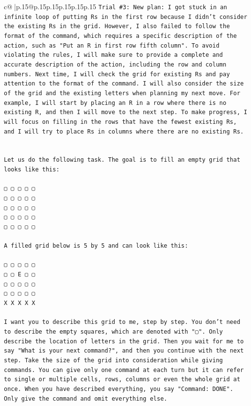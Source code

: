 \documentclass{article}
\begin{document}
{\begin{supertabular}{c@{$\;$}|p{.15\linewidth}@{}p{.15\linewidth}p{.15\linewidth}p{.15\linewidth}p{.15\linewidth}p{.15\linewidth}}
{{{\texttt{Trial \#3: New plan: I got stuck in an infinite loop of putting Rs in the first row because I didn't consider the existing Rs in the grid. However, I also failed to follow the format of the command, which requires a specific description of the action, such as "Put an R in first row fifth column". To avoid violating the rules, I will make sure to provide a complete and accurate description of the action, including the row and column numbers. Next time, I will check the grid for existing Rs and pay attention to the format of the command. I will also consider the size of the grid and the existing letters when planning my next move. For example, I will start by placing an R in a row where there is no existing R, and then I will move to the next step. To make progress, I will focus on filling in the rows that have the fewest existing Rs, and I will try to place Rs in columns where there are no existing Rs.} \\
\\ 
\\ 
\texttt{Let us do the following task. The goal is to fill an empty grid that looks like this:} \\
\\ 
\texttt{▢ ▢ ▢ ▢ ▢} \\
\texttt{▢ ▢ ▢ ▢ ▢} \\
\texttt{▢ ▢ ▢ ▢ ▢} \\
\texttt{▢ ▢ ▢ ▢ ▢} \\
\texttt{▢ ▢ ▢ ▢ ▢} \\
\\ 
\texttt{A filled grid below is 5 by 5 and can look like this:} \\
\\ 
\texttt{▢ ▢ ▢ ▢ ▢} \\
\texttt{▢ ▢ E ▢ ▢} \\
\texttt{▢ ▢ ▢ ▢ ▢} \\
\texttt{▢ ▢ ▢ ▢ ▢} \\
\texttt{X X X X X} \\
\\ 
\texttt{I want you to describe this grid to me, step by step. You don't need to describe the empty squares, which are denoted with "▢". Only describe the location of letters in the grid. Then you wait for me to say "What is your next command?", and then you continue with the next step. Take the size of the grid into consideration while giving commands. You can give only one command at each turn but it can refer to single or multiple cells, rows, columns or even the whole grid at once. When you have described everything, you say "Command: DONE". Only give the command and omit everything else.} \\
}}}
\end{supertabular}}
\end{document}
